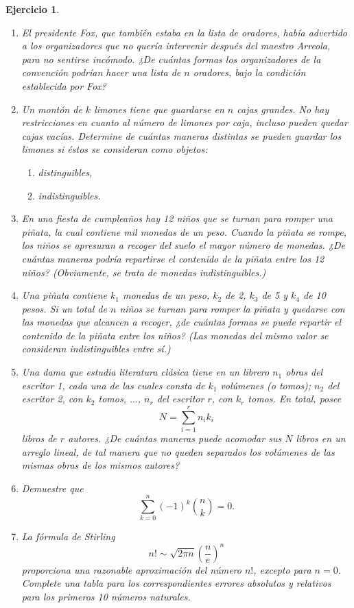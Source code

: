 \documentclass[12pt,twoside]{article}
\newtheorem{Ejer}{Ejercicio}
\begin{document}
\begin{Ejer}
\begin{enumerate}
\item El presidente Fox, que también estaba en la lista de oradores, había advertido a los organizadores que no quería intervenir después del maestro Arreola, para no sentirse incómodo. ¿De cuántas formas los organizadores de la convención podrían hacer una lista de $n$ oradores, bajo la condición establecida por Fox?

\item Un montón de $k$ limones tiene que guardarse en $n$ cajas grandes. No hay restricciones en cuanto al número de limones por caja, incluso pueden quedar cajas vacías. Determine de cuántas maneras distintas se pueden guardar los limones si éstos se consideran como objetos:
\begin{enumerate}
\item distinguibles,
\item indistinguibles.
\end{enumerate}

\item En una fiesta de cumpleaños hay 12 niños que se turnan para romper una piñata, la cual contiene mil monedas de un peso. Cuando la piñata se rompe, los niños se apresuran a recoger del suelo el mayor número de monedas. ¿De cuántas maneras podría repartirse el contenido de la piñata entre los 12 niños? (Obviamente, se trata de monedas indistinguibles.)

\item Una piñata contiene $k_1$ monedas de un peso, $k_2$ de 2, $k_3$ de 5 y $k_4$ de 10 pesos. Si un total de $n$ niños se turnan para romper la piñata y quedarse con las monedas que alcancen a recoger, ¿de cuántas formas se puede repartir el contenido de la piñata entre los niños? (Las monedas del mismo valor se consideran indistinguibles entre sí.)

\item Una dama que estudia literatura clásica tiene en un librero $n_1$ obras del escritor 1, cada una de las cuales consta de $k_1$ volúmenes (o tomos); $n_2$ del escritor 2, con $k_2$ tomos, $\dots$, $n_r$ del escritor $r$, con $k_r$ tomos. En total, posee
\[
N=\sum_{i=1}^{r} n_i k_i
\]
libros de $r$ autores. ¿De cuántas maneras puede acomodar sus $N$ libros en un arreglo lineal, de tal manera que no queden separados los volúmenes de las mismas obras de los mismos autores?

\item Demuestre que
\[
\sum_{k=0}^{n}(-1)^k\binom{n}{k}=0.
\]

\item La fórmula de Stirling
\[
n! \sim \sqrt{2\pi n}\left(\frac{n}{e}\right)^n
\]
proporciona una razonable aproximación del número $n!$, excepto para $n=0$. Complete una tabla para los correspondientes errores absolutos y relativos para los primeros 10 números naturales.


\end{enumerate}
\end{Ejer}
\end{document}
